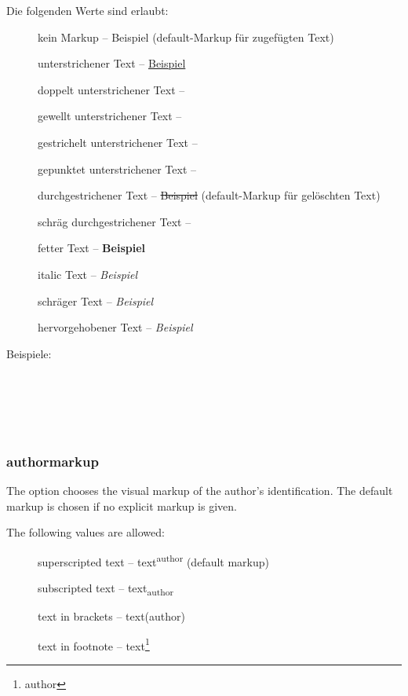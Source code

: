 	Die folgenden Werte sind erlaubt:
	\begin{description}
		\item [] kein Markup -- Beispiel (default-Markup für zugefügten Text)
		\item [] unterstrichener Text -- \uline{Beispiel}
		\item [] doppelt unterstrichener Text -- 
		\item [] gewellt unterstrichener Text -- 
		\item [] gestrichelt unterstrichener Text -- 
		\item [] gepunktet unterstrichener Text -- 
		\item [] durchgestrichener Text -- \sout{Beispiel} (default-Markup für gelöschten Text)
		\item [] schräg durchgestrichener Text -- 
		\item [] fetter Text -- \textbf{Beispiel}
		\item [] italic Text -- \textit{Beispiel}
		\item [] schräger Text -- \textsl{Beispiel}
		\item [] hervorgehobener Text -- \emph{Beispiel}
	\end{description}

	Beispiele:
\fi

\\
\\
\\
\\



\subsubsection{authormarkup}
\ifENGLISH
The  option chooses the visual markup of the author's identification.
The default markup is chosen if no explicit markup is given.

The following values are allowed:
\begin{description}
	\item [] superscripted text -- text\textsuperscript{author} (default markup)
	\item [] subscripted text -- text\textsubscript{author}
	\item [] text in brackets -- text(author)
	\item [] text in footnote -- text\footnote{author}
\end{description}

